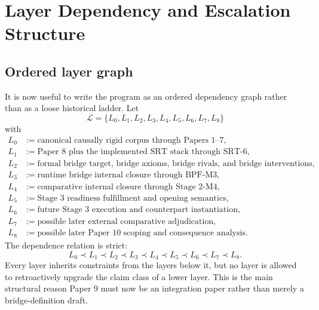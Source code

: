 \documentclass[11pt,a4paper]{article}
\theoremstyle{definition}
\begin{document}
\section{Layer Dependency and Escalation Structure}
\subsection{Ordered layer graph}
It is now useful to write the program as an ordered dependency graph rather than as a loose historical ladder. Let
\[
\mathcal{L}=\{L_0,L_1,L_2,L_3,L_4,L_5,L_6,L_7,L_8\}
\]
with
\begin{align*}
L_0 &:= \text{canonical causally rigid corpus through Papers 1--7},\\
L_1 &:= \text{Paper 8 plus the implemented SRT stack through SRT-6},\\
L_2 &:= \text{formal bridge target, bridge axioms, bridge rivals, and bridge interventions},\\
L_3 &:= \text{runtime bridge internal closure through BPF-M3},\\
L_4 &:= \text{comparative internal closure through Stage 2-M4},\\
L_5 &:= \text{Stage 3 readiness fulfillment and opening semantics},\\
L_6 &:= \text{future Stage 3 execution and counterpart instantiation},\\
L_7 &:= \text{possible later external comparative adjudication},\\
L_8 &:= \text{possible later Paper 10 scoping and consequence analysis}.
\end{align*}
The dependence relation is strict:
\[
L_0 \prec L_1 \prec L_2 \prec L_3 \prec L_4 \prec L_5 \prec L_6 \prec L_7 \prec L_8.
\]
Every layer inherits constraints from the layers below it, but no layer is allowed to retroactively upgrade the claim class of a lower layer. This is the main structural reason Paper 9 must now be an integration paper rather than merely a bridge-definition draft.
\end{document}
